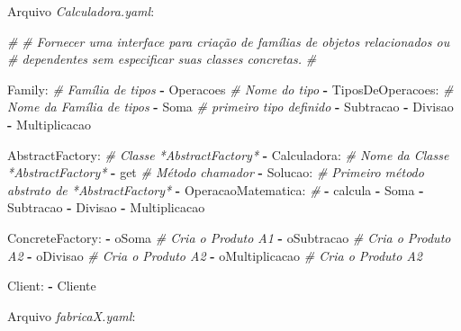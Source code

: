 \documentclass[]{article}
\newenvironment{Shaded}{}{}
\newcommand{\KeywordTok}[1]{\textcolor[rgb]{0.00,0.44,0.13}{\textbf{{#1}}}}
\newcommand{\CommentTok}[1]{\textcolor[rgb]{0.38,0.63,0.69}{\textit{{#1}}}}
\newcommand{\FunctionTok}[1]{\textcolor[rgb]{0.02,0.16,0.49}{{#1}}}
\newcommand{\NormalTok}[1]{{#1}}
\begin{document}
\clearpage
Arquivo \emph{Calculadora.yaml}:

\begin{Shaded}
\begin{Highlighting}[]
\CommentTok{#}
\CommentTok{# Fornecer uma interface para criação de famílias de objetos relacionados ou}
\CommentTok{# dependentes sem especificar suas classes concretas.}
\CommentTok{#}

\FunctionTok{Family:}                     \CommentTok{# Família de tipos}
\KeywordTok{-} \NormalTok{Operacoes                 }\CommentTok{# Nome do tipo}
\KeywordTok{-} \FunctionTok{TiposDeOperacoes:}         \CommentTok{# Nome da Família de tipos}
    \KeywordTok{-} \NormalTok{Soma                  }\CommentTok{# primeiro tipo definido}
    \KeywordTok{-} \NormalTok{Subtracao}
    \KeywordTok{-} \NormalTok{Divisao}
    \KeywordTok{-} \NormalTok{Multiplicacao}

\FunctionTok{AbstractFactory:}            \CommentTok{# Classe *AbstractFactory*}
\KeywordTok{-} \FunctionTok{Calculadora:}              \CommentTok{# Nome da Classe *AbstractFactory*}
    \KeywordTok{-} \NormalTok{get                   }\CommentTok{# Método chamador}
    \KeywordTok{-} \FunctionTok{Solucao:}              \CommentTok{# Primeiro método abstrato de *AbstractFactory*}
        \KeywordTok{-} \FunctionTok{OperacaoMatematica:} \CommentTok{#}
            \KeywordTok{-} \NormalTok{calcula}
            \KeywordTok{-} \NormalTok{Soma}
            \KeywordTok{-} \NormalTok{Subtracao}
            \KeywordTok{-} \NormalTok{Divisao}
            \KeywordTok{-} \NormalTok{Multiplicacao}

\FunctionTok{ConcreteFactory:}
\KeywordTok{-} \NormalTok{oSoma             }\CommentTok{# Cria o Produto A1}
\KeywordTok{-} \NormalTok{oSubtracao        }\CommentTok{# Cria o Produto A2}
\KeywordTok{-} \NormalTok{oDivisao          }\CommentTok{# Cria o Produto A2}
\KeywordTok{-} \NormalTok{oMultiplicacao    }\CommentTok{# Cria o Produto A2}

\FunctionTok{Client:}
\KeywordTok{-} \NormalTok{Cliente}
\end{Highlighting}
\end{Shaded}

\clearpage
Arquivo \emph{fabricaX.yaml}:
\end{document}
